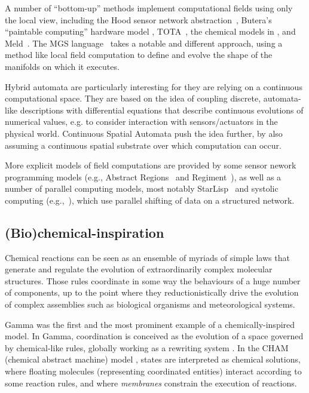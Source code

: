 \documentclass[12pt,a4paper,twoside,openright]{book}
\begin{document}
A number of ``bottom-up'' methods implement computational fields using only the local view, including the Hood sensor network abstraction~\cite{hood}, Butera's ``paintable computing'' hardware model \cite{butera}, TOTA~\cite{mamei2009acm}, the chemical models in \cite{VCMZ-TAAS2011}, and Meld~\cite{Meld}.
%
The MGS language~\cite{GiavittoMGS05} takes a notable and different approach, using a method like local field computation to define and evolve the shape of the manifolds on which it executes.

Hybrid automata \cite{561342} are particularly interesting for they are relying on a continuous computational space.
%
They are based on the idea of coupling discrete, automata-like descriptions with differential equations that describe continuous evolutions of numerical values, e.g. to consider interaction with sensors/actuators in the physical world.
%
Continuous Spatial Automata \cite{maclennanCSA} push the idea further, by also assuming a continuous spatial substrate over which computation can occur.

More explicit models of field computations are provided by some sensor nework programming models (e.g., Abstract Regions~\cite{welsh2004regions} and Regiment~\cite{regiment}), as well
as a number of parallel computing models, most notably StarLisp~\cite{starlisp} and systolic computing (e.g.,~\cite{SDEF,ReLaCS}), which use parallel shifting of data on a structured network.


\subsection{(Bio)chemical-inspiration}

Chemical reactions can be seen as an ensemble of myriads of simple laws that generate and regulate the evolution of extraordinarily complex molecular structures.
%
Those rules coordinate in some way the behaviours of a huge number of components, up to the point where they reductionistically drive the evolution of complex assemblies such as biological organisms and meteorological systems.

Gamma \cite{gamma-scico15} was the first and the most prominent example of a chemically-inspired model.
%
In Gamma, coordination is conceived as the evolution of a space governed by chemical-like rules, globally working as a rewriting system \cite{gamma-lncs2235}.
%
In the CHAM (chemical abstract machine) model \cite{cham-tcs96}, states are interpreted as chemical solutions, where floating molecules (representing coordinated entities) interact according to some reaction rules, and where \emph{membranes} constrain the execution of reactions.
\end{document}
